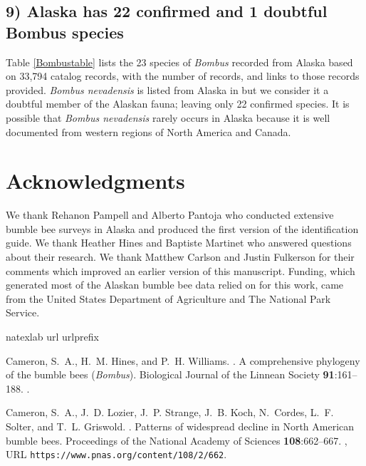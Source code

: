 \begin{multicols}{2}
\subsection{9) Alaska has 22 confirmed and 1 doubtful Bombus species} 

Table \ref{Bombustable} lists the 23 species of \textit{Bombus} recorded from Alaska based on 33,794  catalog records, with the number of records, and links to those records provided. \textit{Bombus nevadensis} is listed from Alaska in \citet{Krombeinetal1979} but we consider it a doubtful member of the Alaskan fauna; leaving only 22 confirmed species. It is possible that \textit{Bombus nevadensis} rarely occurs in Alaska because it is well documented from western regions of North America and Canada.

\section{Acknowledgments}

We thank Rehanon Pampell and Alberto Pantoja who conducted extensive bumble bee surveys in Alaska and produced the first version of the identification guide. We thank Heather Hines and Baptiste Martinet who answered questions about their research. We thank Matthew Carlson and Justin Fulkerson for their comments which improved an earlier version of this manuscript. Funding, which generated most of the Alaskan bumble bee data relied on for this work, came from the United States Department of Agriculture and The National Park Service.

%

\begin{thebibliography}{24}
\expandafter\ifx\csname natexlab\endcsname\relax\def\natexlab#1{#1}\fi
\expandafter\ifx\csname url\endcsname\relax
  \def\url#1{{\tt #1}}\fi
\expandafter\ifx\csname urlprefix\endcsname\relax\def\urlprefix{{\small URL}
  }\fi

Cameron, S.~A., H.~M. Hines, and P.~H. Williams.
.
\newblock A comprehensive phylogeny of the bumble bees (\textit{Bombus}).
\newblock Biological Journal of the Linnean Society {\bfseries 91}:161--188.
\newblock {}.

Cameron, S.~A., J.~D. Lozier, J.~P. Strange, J.~B. Koch, N.~Cordes, L.~F.
  Solter, and T.~L. Griswold.
.
\newblock Patterns of widespread decline in North American bumble bees.
\newblock Proceedings of the National Academy of Sciences {\bfseries
  108}:662--667.
\newblock {},
  \urlprefix\url{https://www.pnas.org/content/108/2/662}.


\end{thebibliography}
\end{multicols}
